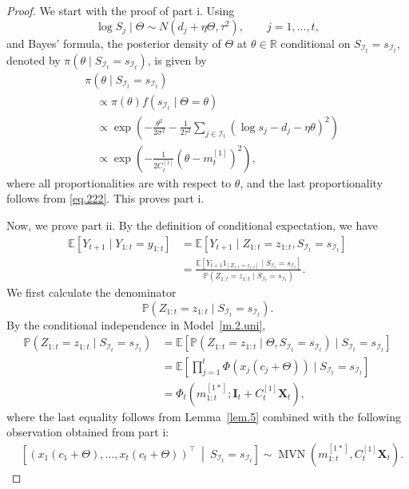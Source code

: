 \documentclass[11pt,authoryear]{elsarticle}
\def\Real{\mathbb{R}}
\def\P#1{{\mathbb{P}}\left(#1\right)}
\def\E#1{{\mathbb E}\left[#1\right]}
\theoremstyle{nopunct}
\numberwithin{equation}{section}
\begin{document}
\begin{proof}
We start with the proof of part i.
Using
\[
\log S_j
\mid
\Theta
\sim
N(d_j+\eta\Theta,\tau^2),
\qquad j=1,\ldots,t,
\]
and Bayes' formula, the posterior density of \(\Theta\) at
\(\theta\in\Real\) conditional on
\(S_{\mathcal I_t}=s_{\mathcal I_t}\), denoted by
\(\pi(\theta\mid S_{\mathcal I_t}=s_{\mathcal I_t})\),
is given by
\[
\begin{aligned}
&\pi(
\theta
\mid
S_{\mathcal I_t}=s_{\mathcal I_t}
)\\
&\quad\propto
\pi(\theta)
f(
s_{\mathcal I_t}
\mid
\Theta=\theta
)\\
&\quad\propto
\exp\left(
-\frac{\theta^2}{2\sigma^2}
-
\frac{1}{2\tau^2}
\sum_{j\in\mathcal I_t}
(\log s_j-d_j-\eta\theta)^2
\right)\\
&\quad\propto
\exp\left(
-\frac{1}{2C_t^{[1]}}(\theta-m_t^{[1]})^2
\right),
\end{aligned}
\]
where all proportionalities are with respect to \(\theta\),
and the last proportionality follows from \eqref{eq.222}.
This proves part i.

Now, we prove part ii.
By the definition of conditional expectation, we have
\begin{equation}\label{eq.6}
\begin{aligned}
\E{
Y_{t+1}
\mid
Y_{1:t}=y_{1:t}
}
&=
\E{
Y_{t+1}
\mid
Z_{1:t}=z_{1:t},
S_{\mathcal I_t}=s_{\mathcal I_t}
}\\
&=
\frac{
\E{
Y_{t+1}1_{\left[Z_{1:t}=z_{1:t}\right]}
\mid
S_{\mathcal I_t}=s_{\mathcal I_t}
}
}{
\P{
Z_{1:t}=z_{1:t}
\mid
S_{\mathcal I_t}=s_{\mathcal I_t}
}
}.
\end{aligned}
\end{equation}
We first calculate the denominator
\[
\P{
Z_{1:t}=z_{1:t}
\mid
S_{\mathcal I_t}=s_{\mathcal I_t}
}.
\]
By the conditional independence in Model~\ref{m.2.uni},
\begin{equation}\label{eq.9}
\begin{aligned}
\P{
Z_{1:t}=z_{1:t}
\mid
S_{\mathcal I_t}=s_{\mathcal I_t}
}&=
\E{
\P{
Z_{1:t}=z_{1:t}
\mid
\Theta,
S_{\mathcal I_t}=s_{\mathcal I_t}
}
\mid
S_{\mathcal I_t}=s_{\mathcal I_t}
}\\
&=
\E{
\prod_{j=1}^t
\Phi\left(
x_j(c_j+\Theta)
\right)
\mid
S_{\mathcal I_t}=s_{\mathcal I_t}
}\\
&=
\Phi_t
\left(
m_{1:t}^{[1*]};
\boldsymbol I_t
+
C_t^{[1]}\boldsymbol X_t
\right),
\end{aligned}
\end{equation}
where the last equality follows from Lemma~\ref{lem.5} combined
with the following observation obtained from part i:
\[
\begin{aligned}
&\left[
\left(
x_1(c_1+\Theta),
\ldots,
x_t(c_t+\Theta)
\right)^\top
\ \middle|\
S_{\mathcal I_t}=s_{\mathcal I_t}
\right]\sim
\operatorname{MVN}
\left(
m_{1:t}^{[1*]},
C_t^{[1]}\boldsymbol X_t
\right).
\end{aligned}
\]


\end{proof}
\end{document}
